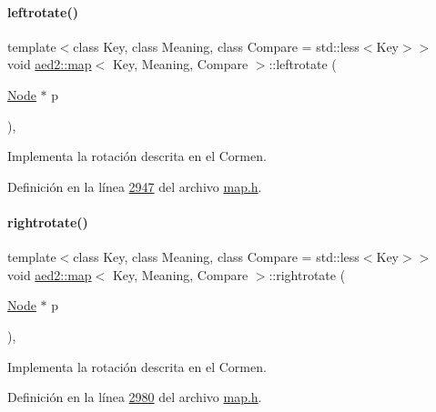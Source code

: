 \paragraph{\texorpdfstring{leftrotate()}{leftrotate()}}
{\footnotesize\ttfamily template$<$class Key, class Meaning, class Compare = std\+::less$<$\+Key$>$$>$ \\
void \hyperlink{classaed2_1_1map}{aed2\+::map}$<$ Key, Meaning, Compare $>$\+::leftrotate (\begin{DoxyParamCaption}\item[{\hyperlink{structaed2_1_1map_1_1Node}{Node} $\ast$}]{p }\end{DoxyParamCaption})\hspace{0.3cm}{\ttfamily [inline]}, {\ttfamily [private]}}



Implementa la rotación descrita en el Cormen. 



Definición en la línea \hyperlink{map_8h_source_l02947}{2947} del archivo \hyperlink{map_8h_source}{map.\+h}.

\mbox{\label{classaed2_1_1map_a816d69fa4dfe18a984dc3628fee14e2f_a816d69fa4dfe18a984dc3628fee14e2f}} 
\paragraph{\texorpdfstring{rightrotate()}{rightrotate()}}
{\footnotesize\ttfamily template$<$class Key, class Meaning, class Compare = std\+::less$<$\+Key$>$$>$ \\
void \hyperlink{classaed2_1_1map}{aed2\+::map}$<$ Key, Meaning, Compare $>$\+::rightrotate (\begin{DoxyParamCaption}\item[{\hyperlink{structaed2_1_1map_1_1Node}{Node} $\ast$}]{p }\end{DoxyParamCaption})\hspace{0.3cm}{\ttfamily [inline]}, {\ttfamily [private]}}



Implementa la rotación descrita en el Cormen. 



Definición en la línea \hyperlink{map_8h_source_l02980}{2980} del archivo \hyperlink{map_8h_source}{map.\+h}.

